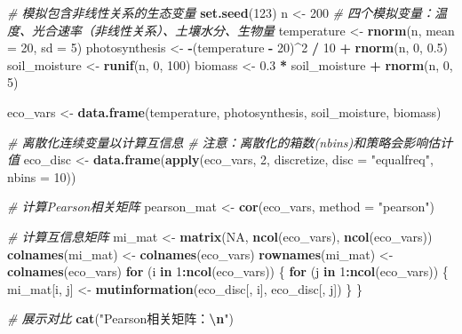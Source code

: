 \documentclass[
  twoside,12pt,fontset=none]{ctexbook}
\newenvironment{Shaded}{\begin{snugshade}}{\end{snugshade}}
\newcommand{\AttributeTok}[1]{\textcolor[rgb]{0.13,0.29,0.53}{#1}}
\newcommand{\CommentTok}[1]{\textcolor[rgb]{0.56,0.35,0.01}{\textit{#1}}}
\newcommand{\ConstantTok}[1]{\textcolor[rgb]{0.56,0.35,0.01}{#1}}
\newcommand{\ControlFlowTok}[1]{\textcolor[rgb]{0.13,0.29,0.53}{\textbf{#1}}}
\newcommand{\DecValTok}[1]{\textcolor[rgb]{0.00,0.00,0.81}{#1}}
\newcommand{\FloatTok}[1]{\textcolor[rgb]{0.00,0.00,0.81}{#1}}
\newcommand{\FunctionTok}[1]{\textcolor[rgb]{0.13,0.29,0.53}{\textbf{#1}}}
\newcommand{\NormalTok}[1]{#1}
\newcommand{\OtherTok}[1]{\textcolor[rgb]{0.56,0.35,0.01}{#1}}
\newcommand{\SpecialCharTok}[1]{\textcolor[rgb]{0.81,0.36,0.00}{\textbf{#1}}}
\newcommand{\StringTok}[1]{\textcolor[rgb]{0.31,0.60,0.02}{#1}}
\begin{document}
\begin{Shaded}
\begin{Highlighting}[]
\CommentTok{\# 模拟包含非线性关系的生态变量}
\FunctionTok{set.seed}\NormalTok{(}\DecValTok{123}\NormalTok{)}
\NormalTok{n }\OtherTok{\textless{}{-}} \DecValTok{200}
\CommentTok{\# 四个模拟变量：温度、光合速率（非线性关系）、土壤水分、生物量}
\NormalTok{temperature }\OtherTok{\textless{}{-}} \FunctionTok{rnorm}\NormalTok{(n, }\AttributeTok{mean =} \DecValTok{20}\NormalTok{, }\AttributeTok{sd =} \DecValTok{5}\NormalTok{)}
\NormalTok{photosynthesis }\OtherTok{\textless{}{-}} \SpecialCharTok{{-}}\NormalTok{(temperature }\SpecialCharTok{{-}} \DecValTok{20}\NormalTok{)}\SpecialCharTok{\^{}}\DecValTok{2} \SpecialCharTok{/} \DecValTok{10} \SpecialCharTok{+} \FunctionTok{rnorm}\NormalTok{(n, }\DecValTok{0}\NormalTok{, }\FloatTok{0.5}\NormalTok{)}
\NormalTok{soil\_moisture }\OtherTok{\textless{}{-}} \FunctionTok{runif}\NormalTok{(n, }\DecValTok{0}\NormalTok{, }\DecValTok{100}\NormalTok{)}
\NormalTok{biomass }\OtherTok{\textless{}{-}} \FloatTok{0.3} \SpecialCharTok{*}\NormalTok{ soil\_moisture }\SpecialCharTok{+} \FunctionTok{rnorm}\NormalTok{(n, }\DecValTok{0}\NormalTok{, }\DecValTok{5}\NormalTok{)}

\NormalTok{eco\_vars }\OtherTok{\textless{}{-}} \FunctionTok{data.frame}\NormalTok{(temperature, photosynthesis, soil\_moisture, biomass)}

\CommentTok{\# 离散化连续变量以计算互信息}
\CommentTok{\# 注意：离散化的箱数(nbins)和策略会影响估计值}
\NormalTok{eco\_disc }\OtherTok{\textless{}{-}} \FunctionTok{data.frame}\NormalTok{(}\FunctionTok{apply}\NormalTok{(eco\_vars, }\DecValTok{2}\NormalTok{,}
\NormalTok{                             discretize, }\AttributeTok{disc =} \StringTok{"equalfreq"}\NormalTok{, }\AttributeTok{nbins =} \DecValTok{10}\NormalTok{))}

\CommentTok{\# 计算Pearson相关矩阵}
\NormalTok{pearson\_mat }\OtherTok{\textless{}{-}} \FunctionTok{cor}\NormalTok{(eco\_vars, }\AttributeTok{method =} \StringTok{"pearson"}\NormalTok{)}

\CommentTok{\# 计算互信息矩阵}
\NormalTok{mi\_mat }\OtherTok{\textless{}{-}} \FunctionTok{matrix}\NormalTok{(}\ConstantTok{NA}\NormalTok{, }\FunctionTok{ncol}\NormalTok{(eco\_vars), }\FunctionTok{ncol}\NormalTok{(eco\_vars))}
\FunctionTok{colnames}\NormalTok{(mi\_mat) }\OtherTok{\textless{}{-}} \FunctionTok{colnames}\NormalTok{(eco\_vars)}
\FunctionTok{rownames}\NormalTok{(mi\_mat) }\OtherTok{\textless{}{-}} \FunctionTok{colnames}\NormalTok{(eco\_vars)}
\ControlFlowTok{for}\NormalTok{ (i }\ControlFlowTok{in} \DecValTok{1}\SpecialCharTok{:}\FunctionTok{ncol}\NormalTok{(eco\_vars)) \{}
  \ControlFlowTok{for}\NormalTok{ (j }\ControlFlowTok{in} \DecValTok{1}\SpecialCharTok{:}\FunctionTok{ncol}\NormalTok{(eco\_vars)) \{}
\NormalTok{    mi\_mat[i, j] }\OtherTok{\textless{}{-}} \FunctionTok{mutinformation}\NormalTok{(eco\_disc[, i], eco\_disc[, j])}
\NormalTok{  \}}
\NormalTok{\}}

\CommentTok{\# 展示对比}
\FunctionTok{cat}\NormalTok{(}\StringTok{"Pearson相关矩阵：}\SpecialCharTok{\textbackslash{}n}\StringTok{"}\NormalTok{)}
\end{Highlighting}
\end{Shaded}
\end{document}
